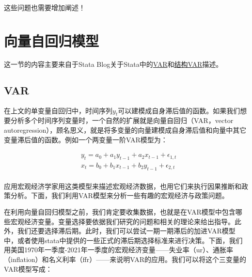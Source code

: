 \documentclass[cn,12pt,math=newtx,citestyle=gb7714-2015,bibstyle=gb7714-2015]{elegantbook}
\begin{document}
    这些问题也需要增加阐述！
	
	\section{向量自回归模型}
	
	这一节的内容主要来自于Stata Blog关于Stata中的\href{https://blog.stata.com/2016/08/09/vector-autoregressions-in-stata/}{VAR}和\href{https://blog.stata.com/2016/09/20/structural-vector-autoregression-models/}{结构VAR}描述。
	
	\subsection{VAR}
	
	在上文的单变量自回归中，时间序列$y_t$可以建模成自身滞后值的函数。如果我们想要分析多个时间序列变量时，一个自然的扩展就是向量自回归（VAR，vector autoregression），顾名思义，就是将多变量的向量建模成自身滞后值和向量中其它变量滞后值的函数。例如一个两变量一阶VAR模型为：
	

		\begin{align*}
		&	y_t =a_0 +a_1 y_{t-1} +a_2 x_{t-1} +\epsilon_{1,t} \\
		&   x_t =b_0 +b_1 x_{t-1} +b_2 y_{t-1}+\epsilon_{2,t}\\	
		\end{align*}
    
    应用宏观经济学家用这类模型来描述宏观经济数据，也用它们来执行因果推断和政策分析。下面，我们利用VAR模型来分析一些有趣的宏观经济与政策问题。
    
    在利用向量自回归模型之前，我们肯定要收集数据，也就是在VAR模型中包含哪些宏观经济变量。变量选择要依据我们研究的问题和相关的理论来给出指导。此外，我们还要选择滞后期。此时，我们可以尝试一期一期滞后的加进VAR模型中，或者使用stata中提供的一些正式的滞后期选择标准来进行决策。下面，我们用美国1970年一季度-2021年一季度的宏观经济变量——失业率（ur）、通胀率（inflation）和名义利率（ffr）——来说明VAR的应用。我们可以将这个三变量的VAR模型写成：
    
\end{document}
